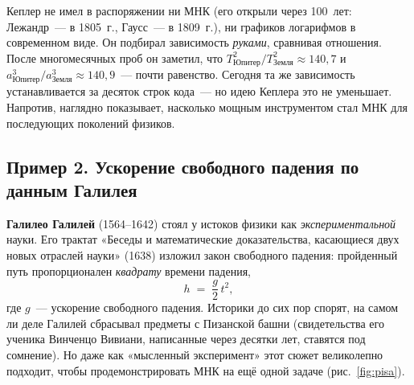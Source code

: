 \begin{notebox}[title={Что увидел сам Кеплер?}]
Кеплер не имел в распоряжении ни МНК (его открыли через 100~лет:
Лежандр~--- в 1805~г., Гаусс~--- в 1809~г.), ни графиков логарифмов в
современном виде. Он подбирал зависимость \emph{руками}, сравнивая
отношения. После многомесячных проб он заметил, что
$T^{2}_{\text{Юпитер}}/T^{2}_{\text{Земля}}\approx 140{,}7$ и
$a^{3}_{\text{Юпитер}}/a^{3}_{\text{Земля}}\approx 140{,}9$~---
почти равенство. Сегодня та же зависимость устанавливается за
десяток строк кода~--- но идею Кеплера это не уменьшает. Напротив,
наглядно показывает, насколько мощным инструментом стал МНК для
последующих поколений физиков.
\end{notebox}

\subsection{Пример 2. Ускорение свободного падения по данным Галилея}
\label{ssec:galileo}

\textbf{Галилео Галилей} (1564–1642) стоял у истоков физики как
\emph{экспериментальной} науки. Его трактат «Беседы и математические
доказательства, касающиеся двух новых отраслей науки» (1638) изложил
закон свободного падения: пройденный путь пропорционален \emph{квадрату}
времени падения,
\begin{equation}\label{eq:freefall}
h\;=\;\frac{g}{2}\,t^{2},
\end{equation}
где $g$~--- ускорение свободного падения. Историки до сих пор спорят, на
самом ли деле Галилей сбрасывал предметы с Пизанской башни (свидетельства
его ученика Винченцо Вивиани, написанные через десятки лет, ставятся под
сомнение). Но даже как «мысленный эксперимент» этот сюжет великолепно
подходит, чтобы продемонстрировать МНК на ещё одной задаче (рис.~\ref{fig:pisa}).


